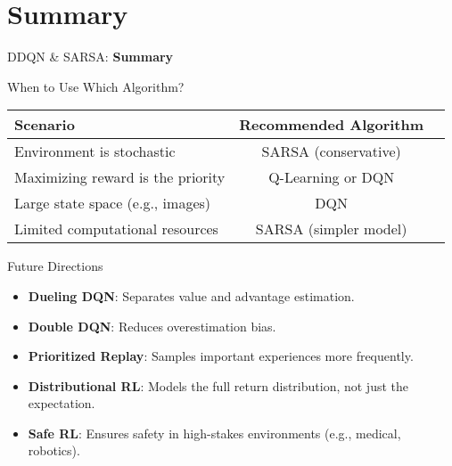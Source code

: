 \section{Summary}
\begin{frame}{}
    \LARGE DDQN \& SARSA: \textbf{Summary}
\end{frame}

\begin{frame}{When to Use Which Algorithm?}
    \begin{table}[]
        \centering
        \renewcommand{\arraystretch}{2.5}
        \begin{tabular}{lcc}
            \hline
            \textbf{Scenario} & \textbf{Recommended Algorithm} \\ \hline
            Environment is stochastic & SARSA (conservative) \\ 
            Maximizing reward is the priority & Q-Learning or DQN \\ 
            Large state space (e.g., images) & DQN \\ 
            Limited computational resources & SARSA (simpler model) \\ \hline
        \end{tabular}
    \end{table}
\end{frame}

\begin{frame}{Future Directions}
    \begin{itemize}
        \setlength{\itemsep}{1em}
        \item \textbf{Dueling DQN}: Separates value and advantage estimation.
        \item \textbf{Double DQN}: Reduces overestimation bias.
        \item \textbf{Prioritized Replay}: Samples important experiences more frequently.
        \item \textbf{Distributional RL}: Models the full return distribution, not just the expectation.
        \item \textbf{Safe RL}: Ensures safety in high-stakes environments (e.g., medical, robotics).
    \end{itemize}
\end{frame}

